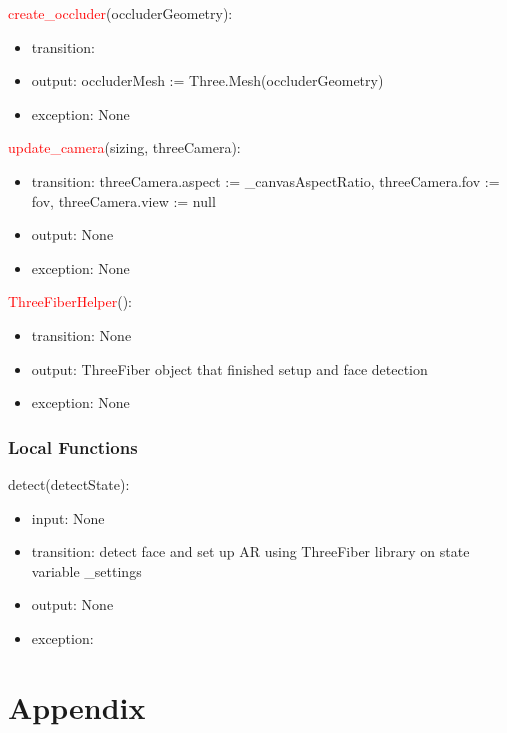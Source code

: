 \documentclass[12pt, titlepage]{article}
\begin{document}
\noindent \textcolor{red}{create\_occluder}(occluderGeometry):
\begin{itemize}
\item transition: 
\item output: occluderMesh := Three.Mesh(occluderGeometry)
\item exception: None
\end{itemize}

\noindent \textcolor{red}{update\_camera}(sizing, threeCamera):
\begin{itemize}
\item transition: threeCamera.aspect := \_canvasAspectRatio, threeCamera.fov := fov, threeCamera.view := null
\item output: None
\item exception: None
\end{itemize}


\noindent \textcolor{red}{ThreeFiberHelper}():
\begin{itemize}
\item transition: None
\item output: ThreeFiber object that finished setup and face detection
\item exception: None
\end{itemize}

\subsubsection{Local Functions}

\noindent detect(detectState):
\begin{itemize}
\item input: None
\item transition: detect face and set up AR using ThreeFiber library on state variable \_settings
\item output: None
\item exception:
\end{itemize}

\color{black}
\section{Appendix} \label{Appendix} 
\end{document}
